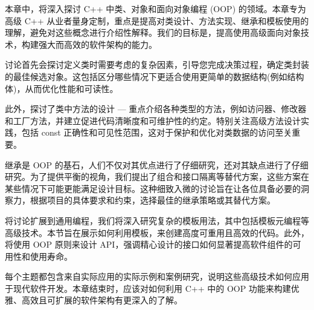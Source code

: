 
本章中，将深入探讨 C++ 中类、对象和面向对象编程 (OOP) 的领域。本章专为高级 C++ 从业者量身定制，重点是提高对类设计、方法实现、继承和模板使用的理解，避免对这些概念进行介绍性解释。我们的目标是，提高使用高级面向对象技术，构建强大而高效的软件架构的能力。

讨论首先会探讨定义类时需要考虑的复杂因素，引导您完成决策过程，确定类封装的最佳候选对象。这包括区分哪些情况下更适合使用更简单的数据结构(例如结构体)，从而优化性能和可读性。

此外，探讨了类中方法的设计 --- 重点介绍各种类型的方法，例如访问器、修改器和工厂方法，并建立促进代码清晰度和可维护性的约定。特别关注高级方法设计实践，包括 const 正确性和可见性范围，这对于保护和优化对类数据的访问至关重要。

继承是 OOP 的基石，人们不仅对其优点进行了仔细研究，还对其缺点进行了仔细研究。为了提供平衡的视角，我们提出了组合和接口隔离等替代方案，这些方案在某些情况下可能更能满足设计目标。这种细致入微的讨论旨在让各位具备必要的洞察力，根据项目的具体要求和约束，选择最佳的继承策略或其替代方案。

将讨论扩展到通用编程，我们将深入研究复杂的模板用法，其中包括模板元编程等高级技术。本节旨在展示如何利用模板，来创建高度可重用且高效的代码。此外，将使用 OOP 原则来设计 API，强调精心设计的接口如何显著提高软件组件的可用性和使用寿命。

每个主题都包含来自实际应用的实际示例和案例研究，说明这些高级技术如何应用于现代软件开发。本章结束时，应该对如何利用 C++ 中的 OOP 功能来构建优雅、高效且可扩展的软件架构有更深入的了解。

